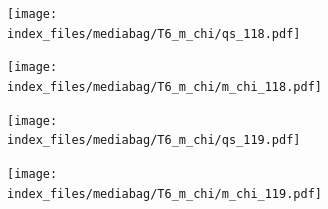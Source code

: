\documentclass[
  11pt,
  letterpaper,
]{scrreprt}
\begin{document}
\begin{figure}

\begin{minipage}{0.50\linewidth}

\begin{figure}[H]

{\centering \texttt{[image: index\_files/mediabag/T6\_m\_chi/qs\_118.pdf]}

}


\end{figure}%

\end{minipage}%
%
\begin{minipage}{0.50\linewidth}

\begin{figure}[H]

{\centering \texttt{[image: index\_files/mediabag/T6\_m\_chi/m\_chi\_118.pdf]}

}


\end{figure}%

\end{minipage}%

\end{figure}%

\begin{figure}

\begin{minipage}{0.50\linewidth}

\begin{figure}[H]

{\centering \texttt{[image: index\_files/mediabag/T6\_m\_chi/qs\_119.pdf]}

}


\end{figure}%

\end{minipage}%
%
\begin{minipage}{0.50\linewidth}

\begin{figure}[H]

{\centering \texttt{[image: index\_files/mediabag/T6\_m\_chi/m\_chi\_119.pdf]}

}


\end{figure}%

\end{minipage}%

\end{figure}%
\end{document}
